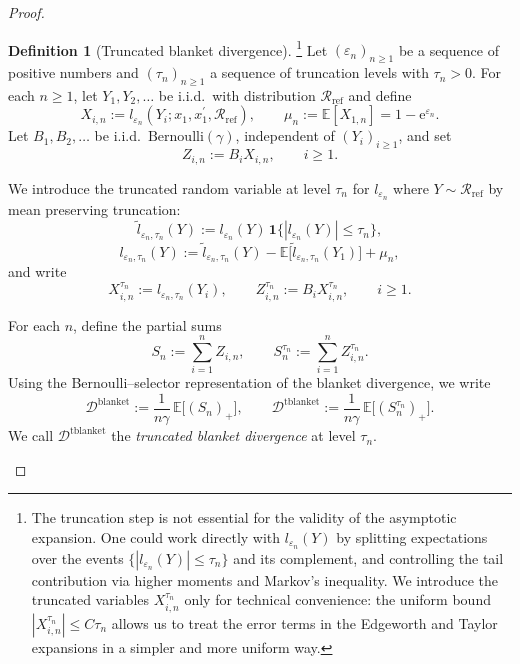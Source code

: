 \documentclass{article}
\theoremstyle{plain}
\theoremstyle{definition}
\newtheorem{definition}{Definition}[section]
\begin{document}
\begin{proof}
\begin{definition}[Truncated blanket divergence]
  \footnote{%
  The truncation step is not essential for the validity of the asymptotic expansion.
  One could work directly with $l_{\varepsilon_n}(Y)$ by splitting expectations over
  the events $\{|l_{\varepsilon_n}(Y)|\le \tau_n\}$ and its complement, and controlling
  the tail contribution via higher moments and Markov's inequality.
  We introduce the truncated variables $X_{i,n}^{\tau_n}$ only for technical convenience:
  the uniform bound $|X_{i,n}^{\tau_n}|\le C \tau_n$ allows us to treat the error terms
  in the Edgeworth and Taylor expansions in a simpler and more uniform way.%
}
\label{def:truncated-blanket}
Let $(\varepsilon_n)_{n\ge 1}$ be a sequence of positive numbers and
$(\tau_n)_{n\ge 1}$ a sequence of truncation levels with $\tau_n>0$.
For each $n\ge1$, let $Y_1,Y_2,\dots$ be i.i.d.\ with distribution
$\mathcal R_{\mathrm{ref}}$ and define
\[
  X_{i,n} := l_{\varepsilon_n}(Y_i;x_1,x_1^\prime,\mathcal{R}_{\mathrm{ref}}), \qquad
  \mu_n := \mathbb E[X_{1,n}] = 1 - \mathrm e^{\varepsilon_n}.
\]
Let $B_1,B_2,\dots$ be i.i.d.\ $\mathrm{Bernoulli}(\gamma)$,
independent of $(Y_i)_{i\ge1}$, and set
\[
  Z_{i,n} := B_i X_{i,n}, \qquad i\ge1.
\]

We introduce the truncated random variable at level $\tau_n$ for $l_{\varepsilon_n}$ where
$Y\sim \mathcal R_{\mathrm{ref}}$ by mean preserving truncation:
\[
  \tilde l_{\varepsilon_n,\tau_n}(Y)
  := l_{\varepsilon_n}(Y)\,
     \mathbf 1\bigl\{|l_{\varepsilon_n}(Y)| \le \tau_n\bigr\},
\]
\[
  l_{\varepsilon_n,\tau_n}(Y)
  := \tilde l_{\varepsilon_n,\tau_n}(Y)
     - \mathbb E\bigl[\tilde l_{\varepsilon_n,\tau_n}(Y_1)\bigr]
     + \mu_n,
\]
and write
\[
  X_{i,n}^{\tau_n} := l_{\varepsilon_n,\tau_n}(Y_i), \qquad
  Z_{i,n}^{\tau_n} := B_i X_{i,n}^{\tau_n}, \qquad i\ge 1.
\]

For each $n$, define the partial sums
\[
  S_n := \sum_{i=1}^n Z_{i,n}, \qquad
  S_n^{\tau_n} := \sum_{i=1}^n Z_{i,n}^{\tau_n}.
\]
Using the Bernoulli–selector representation of the blanket divergence,
we write
\[
  \mathcal D^{\mathrm{blanket}}
  := \frac{1}{n\gamma}\,\mathbb E\bigl[(S_n)_+\bigr],
  \qquad
  \mathcal D^{\mathrm{tblanket}}
  := \frac{1}{n\gamma}\,\mathbb E\bigl[(S_n^{\tau_n})_+\bigr].
\]
We call $\mathcal D^{\mathrm{tblanket}}$ the \emph{truncated blanket divergence}
at level $\tau_n$.
\end{definition}


\end{proof}
\end{document}
